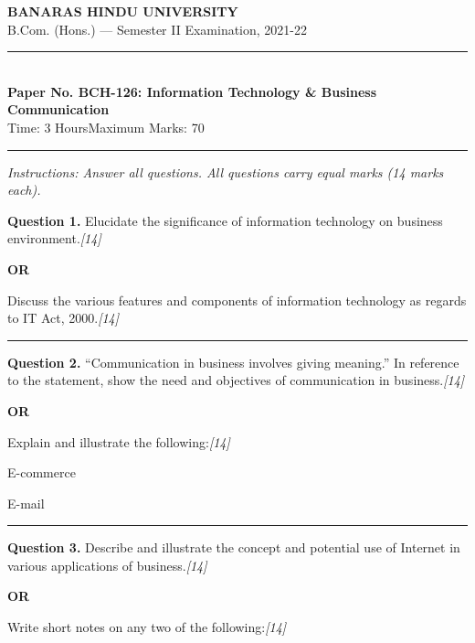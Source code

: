 \documentclass[11pt,a4paper]{article}
\newcommand{\pts}[1]{\hfill   \textit{[#1]}}
\begin{document}
\begin{center}
  {\large\bfseries BANARAS HINDU UNIVERSITY}\\[2pt]
  {\normalsize B.Com. (Hons.) --- Semester II Examination, 2021-22}\\[6pt]
  \rule{0.8\linewidth}{0.5pt}\\[6pt]
  {\large\bfseries Paper No. BCH-126: Information Technology \& Business Communication}\\[4pt]
  {\normalsize Time: 3 Hours\hfill Maximum Marks: 70}
\end{center}

\rule{\linewidth}{0.4pt}

\smallskip



\noindent   \textit{Instructions: Answer all questions. All questions carry equal marks (14 marks each).}

\bigskip




\noindent   \textbf{Question 1.}
Elucidate the significance of information technology on business environment.\pts{14}

\centerline{   \textbf{OR}}

Discuss the various features and components of information technology as regards to IT Act, 2000.\pts{14}

\medskip\rule{\linewidth}{0.2pt}




\noindent   \textbf{Question 2.}
``Communication in business involves giving meaning.'' In reference to the statement, show the need and objectives of communication in business.\pts{14}

\centerline{   \textbf{OR}}

Explain and illustrate the following:\pts{14}

\begin{parts}
  \item E-commerce
  \item E-mail
\end{parts}

\medskip\rule{\linewidth}{0.2pt}




\noindent   \textbf{Question 3.}
Describe and illustrate the concept and potential use of Internet in various applications of business.\pts{14}

\centerline{   \textbf{OR}}

Write short notes on any two of the following:\pts{14}
\end{document}
